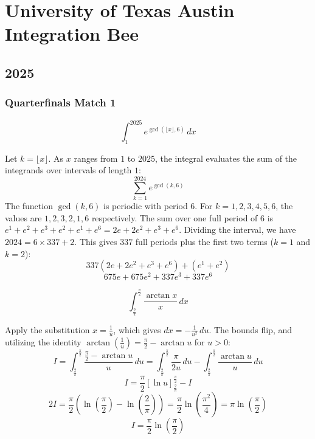 \section{University of Texas Austin Integration Bee}
\subsection*{2025}

\subsubsection*{Quarterfinals Match 1}
\begin{questions}
    \question
    \[ \int_{1}^{2025} e^{\gcd(\lfloor x \rfloor, 6)} \, dx \]
    \begin{solution}
        Let $k = \lfloor x \rfloor$. As $x$ ranges from $1$ to $2025$, the integral evaluates the sum of the integrands over intervals of length $1$:
        \[ \sum_{k=1}^{2024} e^{\gcd(k, 6)} \]
        The function $\gcd(k, 6)$ is periodic with period $6$. For $k = 1, 2, 3, 4, 5, 6$, the values are $1, 2, 3, 2, 1, 6$ respectively.
        The sum over one full period of $6$ is $e^1 + e^2 + e^3 + e^2 + e^1 + e^6 = 2e + 2e^2 + e^3 + e^6$.
        Dividing the interval, we have $2024 = 6 \times 337 + 2$. 
        This gives $337$ full periods plus the first two terms ($k=1$ and $k=2$):
        \[ 337(2e + 2e^2 + e^3 + e^6) + (e^1 + e^2) \]
        \[ 675e + 675e^2 + 337e^3 + 337e^6 \]
    \end{solution}

    \question
    \[ \int_{\frac{2}{\pi}}^{\frac{\pi}{2}} \frac{\arctan x}{x} \, dx \]
    \begin{solution}
        Apply the substitution $x = \frac{1}{u}$, which gives $dx = -\frac{1}{u^2} \, du$. The bounds flip, and utilizing the identity $\arctan\left(\frac{1}{u}\right) = \frac{\pi}{2} - \arctan u$ for $u > 0$:
        \[ I = \int_{\frac{2}{\pi}}^{\frac{\pi}{2}} \frac{\frac{\pi}{2} - \arctan u}{u} \, du = \int_{\frac{2}{\pi}}^{\frac{\pi}{2}} \frac{\pi}{2u} \, du - \int_{\frac{2}{\pi}}^{\frac{\pi}{2}} \frac{\arctan u}{u} \, du \]
        \[ I = \frac{\pi}{2} \left[ \ln u \right]_{\frac{2}{\pi}}^{\frac{\pi}{2}} - I \]
        \[ 2I = \frac{\pi}{2} \left( \ln\left(\frac{\pi}{2}\right) - \ln\left(\frac{2}{\pi}\right) \right) = \frac{\pi}{2} \ln\left(\frac{\pi^2}{4}\right) = \pi \ln\left(\frac{\pi}{2}\right) \]
        \[ I = \frac{\pi}{2} \ln\left(\frac{\pi}{2}\right) \]
    \end{solution}


\end{questions}
